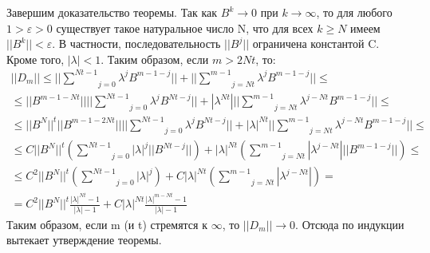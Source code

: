 \begin{Proof}
	Завершим доказательство теоремы. Так как $B^k \to 0$ при $k \to \infty$, то для любого $1 > \varepsilon > 0$ существует такое натуральное число N, что для всех $k \ge N$ имеем $||B^k|| < \varepsilon$. В частности, последовательность $||B^j||$ ограничена константой C. Кроме того, $|\lambda| < 1$. Таким образом, если $m > 2Nt$, то:
	$$\begin{gathered}
		||D_m|| \le \Big|\Big| \underset{j=0}{\overset{Nt-1}{\sum}}\lambda^j B^{m-1-j}\Big|\Big| + \Big|\Big| \underset{j=Nt}{\overset{m-1}{\sum}}\lambda^j B^{m-1-j}\Big|\Big| \le \\
		\le ||B^{m-1-Nt}||\Big|\Big|\underset{j=0}{\overset{Nt-1}{\sum}}\lambda^j B^{Nt-j}\Big|\Big| + |\lambda^{Nt}|\Big|\Big|\underset{j=Nt}{\overset{m-1}{\sum}}\lambda^{j-Nt}B^{m-1-j}\Big|\Big| \le \\
		\le ||B^N||^t||B^{m-1-2Nt}||\Big|\Big|\underset{j=0}{\overset{Nt-1}{\sum}}\lambda^j B^{Nt-j}\Big|\Big| + |\lambda|^{Nt}\Big|\Big|\underset{j=Nt}{\overset{m-1}{\sum}}\lambda^{j-Nt}B^{m-1-j}\Big|\Big| \le \\
		\le C ||B^N||^t \left( \underset{j=0}{\overset{Nt-1}{\sum}}|\lambda|^j ||B^{Nt-j}|| \right) + |\lambda|^{Nt} \left( \underset{j=Nt}{\overset{m-1}{\sum}}|\lambda^{j-Nt}|||B^{m-1-j}|| \right) \le \\
		\le C^2 ||B^N||^t \left( \underset{j=0}{\overset{Nt-1}{\sum}}|\lambda|^j \right) + C |\lambda|^{Nt} \left( \underset{j=Nt}{\overset{m-1}{\sum}}|\lambda^{j-Nt}| \right) = \\
		= C^2 ||B^N||^t \frac{|\lambda|^{Nt}-1}{|\lambda|-1} + C |\lambda|^{Nt} \frac{|\lambda|^{m-Nt}-1}{|\lambda|-1}
	\end{gathered}$$
	Таким образом, если m (и t) стремятся к $\infty$, то $||D_m|| \to 0$. Отсюда по индукции вытекает утверждение теоремы.
\end{Proof}
